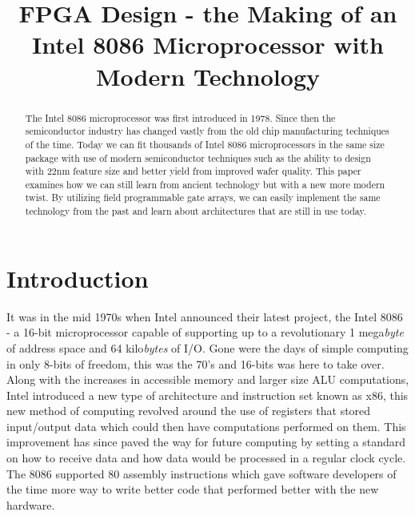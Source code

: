 \documentclass[conference]{IEEEtran}
\begin{document}
\title{FPGA Design - the Making of an Intel 8086 Microprocessor with Modern Technology}

\maketitle

\begin{abstract}
The Intel 8086 microprocessor was first introduced in 1978. Since then the semiconductor industry has changed vastly from the old chip manufacturing techniques of the time. Today we can fit thousands of Intel 8086 microprocessors in the same size package with use of modern semiconductor techniques such as the ability to design with 22nm feature size and better yield from improved wafer quality. This paper examines how we can still learn from ancient technology but with a new more modern twist. By utilizing field programmable gate arrays, we can easily implement the same technology from the past and learn about architectures that are still in use today.
\end{abstract}

\section{Introduction}
It was in the mid 1970s when Intel announced their latest project, the Intel 8086 -  a 16-bit microprocessor capable of supporting up to a revolutionary 1 mega{\em byte} of address space and 64 kilo{\em bytes} of I/O. Gone were the days of simple computing in only 8-bits of freedom, this was the 70's and 16-bits was here to take over. Along with the increases in accessible memory and larger size ALU computations, Intel introduced a new type of architecture and instruction set known as x86, this new method of computing revolved around the use of registers that stored input/output data which could then have computations performed on them. This improvement has since paved the way for future computing by setting a standard on how to receive data and how data would be processed in a regular clock cycle. The 8086 supported 80 assembly instructions which gave software developers of the time more way to write better code that performed better with the new hardware.
\end{document}
